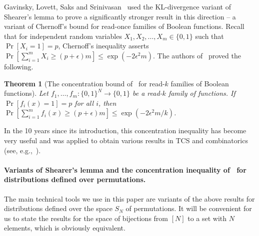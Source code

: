 \documentclass[11pt]{article}
\newtheorem{theorem}{Theorem}[section]
\begin{document}
Gavinsky, Lovett, Saks and Srinivasan~\cite{GavinskyLSS15} used the KL-divergence variant of Shearer's lemma to prove a significantly stronger result in this direction -- a variant of Chernoff's bound for read-once families of Boolean functions. Recall that for independent random variables $X_1,X_2,\ldots,X_m \in \{0,1\}$ such that $\Pr[X_i=1]=p$, Chernoff's inequality asserts $\Pr[\sum_{i=1}^m X_i \geq (p+\epsilon)m] \leq \exp(-2\epsilon^2 m)$. The authors of~\cite{GavinskyLSS15} proved the following.
\begin{theorem}[The concentration bound of~\cite{GavinskyLSS15} for read-$k$ families of Boolean functions]
\label{Thm:Gavinsky-intro}
    Let $f_1,\ldots,f_m:\{0,1\}^N \to \{0,1\}$ be a read-$k$ family of functions. If $\Pr[f_i(x)=1]=p$ for all $i$, then $\Pr[\sum_{i=1}^m f_i(x) \geq (p+\epsilon)m] \leq \exp(-2\epsilon^2 m/k)$.
\end{theorem}
In the 10 years since its introduction, this concentration inequality 
has become very useful and 
was applied to obtain various results in TCS and combinatorics (see, e.g.,~\cite{HatamiHTT21,HiraharaS24,Kahn22,KuniskySWY25}). 

\paragraph{Variants of Shearer's lemma and the concentration inequality of~\cite{GavinskyLSS15} for distributions defined over permutations.} The main technical tools we use in this paper are variants of the above results for distributions defined over the space $S_N$ of permutations. It will be convenient for us to state the results for the space of bijections from $[N]$ to a set with $N$ elements, which is obviously equivalent.
\end{document}
